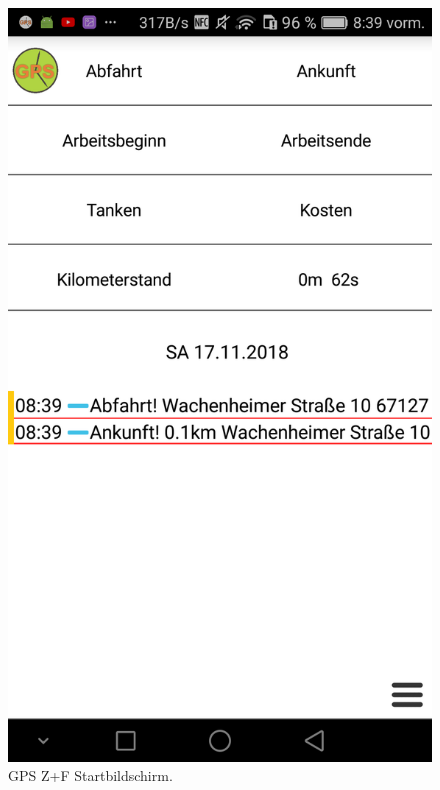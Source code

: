 \documentclass[a4paper]{article}
\begin{document}
\begin{figure}[H]%
    \begin{minipage}[b]{.4\linewidth} %
        \includegraphics[scale=0.14]{img/gps1}
        \caption{\label{img:img/gps1}GPS Z+F Startbildschirm.}
    \end{minipage}
    \hspace{0.1\linewidth}%
    \begin{minipage}[b]{.4\linewidth} %

\end{minipage}
\end{figure}
\end{document}
